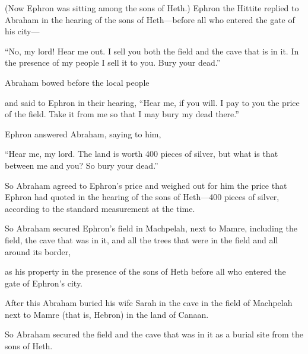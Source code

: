 \begin{scripture}
 (Now Ephron was sitting among the sons of Heth.) Ephron the Hittite replied to Abraham in the hearing of the sons of Heth---before all who entered the gate of his city---
 ``No, my lord! Hear me out. I sell you both the field and the cave that is in it. In the presence of my people I sell it to you. Bury your dead.''
\everypar{}

 Abraham bowed before the local people
 and said to Ephron in their hearing, ``Hear me, if you will. I pay to you the price of the field. Take it from me so that I may bury my dead there.''
\everypar{}

 Ephron answered Abraham, saying to him,
 ``Hear me, my lord. The land is worth 400 pieces of silver, but what is that between me and you? So bury your dead.''
\everypar{}

 So Abraham agreed to Ephron's price and weighed out for him the price that Ephron had quoted in the hearing of the sons of Heth---400 pieces of silver, according to the standard measurement at the time.
\everypar{}

 So Abraham secured Ephron's field in Machpelah, next to Mamre, including the field, the cave that was in it, and all the trees that were in the field and all around its border,
 as his property in the presence of the sons of Heth before all who entered the gate of Ephron's city.
\everypar{}

 After this Abraham buried his wife Sarah in the cave in the field of Machpelah next to Mamre (that is, Hebron) in the land of Canaan.
 So Abraham secured the field and the cave that was in it as a burial site from the sons of Heth.


\end{scripture}

